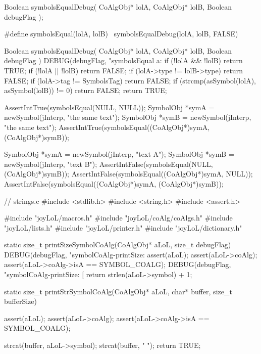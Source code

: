 
\startCHeader
Boolean symbolsEqualDebug(
  CoAlgObj* lolA,
  CoAlgObj* lolB,
  Boolean debugFlag
);

#define symbolsEqual(lolA, lolB) \
  symbolsEqualDebug(lolA, lolB, FALSE)
\stopCHeader

\startCCode
Boolean symbolsEqualDebug(
  CoAlgObj* lolA,
  CoAlgObj* lolB,
  Boolean debugFlag
) {
  DEBUG(debugFlag, "symbolsEqual a:%
  if (!lolA && !lolB) return TRUE;
  if (!lolA || !lolB) return FALSE;
  if (lolA->type != lolB->type) return FALSE;
  if (lolA->tag != SymbolsTag) return FALSE;
  if (strcmp(asSymbol(lolA), asSymbol(lolB)) != 0) return FALSE;
  return TRUE;
}
\stopCCode


\startCTest
  AssertIntTrue(symbolsEqual(NULL, NULL));
  SymbolObj *symA = newSymbol(jInterp, "the same text");
  SymbolObj *symB = newSymbol(jInterp, "the same text");
  AssertIntTrue(symbolsEqual((CoAlgObj*)symA, (CoAlgObj*)symB));
\stopCTest
\stopTestCase


\startCTest
  SymbolObj *symA = newSymbol(jInterp, "text A");
  SymbolObj *symB = newSymbol(jInterp, "text B");
  AssertIntFalse(symbolsEqual(NULL, (CoAlgObj*)symB));
  AssertIntFalse(symbolsEqual((CoAlgObj*)symA, NULL));
  AssertIntFalse(symbolsEqual((CoAlgObj*)symA, (CoAlgObj*)symB));
\stopCTest
\stopTestCase
\stopTestSuite

\starttyping
// strings.c
#include <stdlib.h>
#include <string.h>
#include <assert.h>

#include "joyLoL/macros.h"
#include "joyLoL/coAlg/coAlgs.h"
#include "joyLoL/lists.h"
#include "joyLoL/printer.h"
#include "joyLoL/dictionary.h"

static size_t printSizeSymbolCoAlg(CoAlgObj* aLoL, size_t debugFlag) {
  DEBUG(debugFlag, "symbolCoAlg-printSize: %
  assert(aLoL);
  assert(aLoL->coAlg);
  assert(aLoL->coAlg->isA == SYMBOL_COALG);
  DEBUG(debugFlag, "symbolCoAlg-printSize: [%
  return strlen(aLoL->symbol) + 1;
}

static size_t printStrSymbolCoAlg(CoAlgObj* aLoL,
                                  char* buffer, size_t bufferSize) {
  assert(aLoL);
  assert(aLoL->coAlg);
  assert(aLoL->coAlg->isA == SYMBOL_COALG);

  strcat(buffer, aLoL->symbol);
  strcat(buffer, " ");
  return TRUE;
}
\stoptyping


